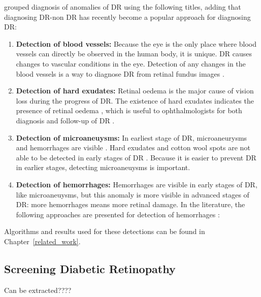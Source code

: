 \citet{rocha2011points} grouped diagnosis of anomalies of DR using the following titles, adding that diagnosing DR-non DR has recently become a popular approach for diagnosing DR:  
\begin{enumerate}
    \item \textbf{Detection of blood vessels:}  Because the eye is the only place where blood vessels can directly be observed in the human body, it is unique. DR causes changes to vascular conditions in the eye. Detection of any changes in the blood vessels is a way to diagnose DR from retinal fundus images \citet{mendonca2006segmentation}.
    \item \textbf{Detection of hard exudates:} Retinal oedema is the major cause of vision loss during the progress of DR. The existence of hard exudates indicates the presence of retinal oedema \citep{singer1992screening}, which is useful to ophthalmologists for both diagnosis and follow-up of DR \citep{garcia2009neural}.
    \item \textbf{Detection of microaneuysms:} In earliest stage of DR, microaneurysms and hemorrhages are visible \citep{doi:10.1056/NEJMra021678}. Hard exudates and cotton wool spots are not able to be detected in early stages of DR \citep{navarro2016automatic}. Because it is easier to prevent DR in earlier stages, detecting microaneuysms is important.
    \item \textbf{Detection of hemorrhages:} Hemorrhages are visible in early stages of DR, like microaneuysms, but this anomaly is more visible in advanced stages of DR: more hemorrhages means more retinal damage. In the literature, the following approaches are presented for detection of hemorrhages \citep{rocha2011points}:
\end{enumerate}

Algorithms and results used for these detections can be found in Chapter~\ref{related_work}.




\subsection{Screening Diabetic Retinopathy}

Can be extracted???? 


